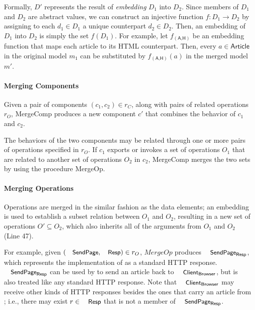 Formally, $D'$ represents the result of \textit{embedding} $D_{1}$ into
$D_{2}$. Since members of $D_{1}$ and $D_{2}$ are abstract values, we can
construct an injective function $f : D_{1} \rightarrow D_{2}$ by assigning
to each $d_{1} \in D_{1}$ a unique counterpart $d_{2} \in D_{2}$. Then, an
embedding of $D_{1}$ into $D_{2}$ is simply the set $f(D_{1})$. For example,
let $f_{(\textsf{A,H})}$ be an embedding function that maps each
article to its HTML counterpart. Then, every $a \in \textsf{Article}$
in the original model $m_{1}$ can be substituted by
$f_{(\textsf{A,H})}(a)$ in the merged model $m'$.


\paragraph{\textbf{Merging Components}} Given a pair of components
$(c_{1}, c_{2}) \in r_{C}$, along with pairs of related operations $r_{O}$,
\textsf{MergeComp} produces a new component $c'$ that combines the
behavior of $c_{1}$ and $c_{2}$.

The behaviors of the two components may be related through one or more
pairs of operations specified in $r_{O}$. If $c_{1}$ exports or invokes
a set of operations $O_{1}$ that are related to another set of operations
$O_{2}$ in $c_{2}$, \textsf{MergeComp} merges the two sets by using the
procedure \textsf{MergeOp}. 


\paragraph{\textbf{Merging Operations}} Operations are merged in the
similar fashion as the data elements; an embedding is used to
establish a subset relation between $O_{1}$ and $O_{2}$, resulting in a new
set of operations $O' \subseteq O_{2}$, which also inherits all of the
arguments from $O_{1}$ and $O_{2}$ (Line 47).

For example, given $(\txtcname{SendPage}, \txtcname{Resp}) \in r_{O}$,
$MergeOp$ produces $\txtcname{SendPage}_{\textsf{Resp}}$, which
represents the implementation of  as a standard HTTP
response.  $\txtcname{SendPage}_{\textsf{Resp}}$ can be used by
 to send an article back to
$\txtcname{Client}_\textsf{Browser}$, but is also treated like any
standard HTTP response. Note that $\txtcname{Client}_\textsf{Browser}$
may receive other kinds of HTTP responses besides the ones that carry
an article from ; i.e., there may exist $r \in
\txtcname{Resp}$ that is not a member of $\txtcname{SendPage}_{\textsf{Resp}}$.

